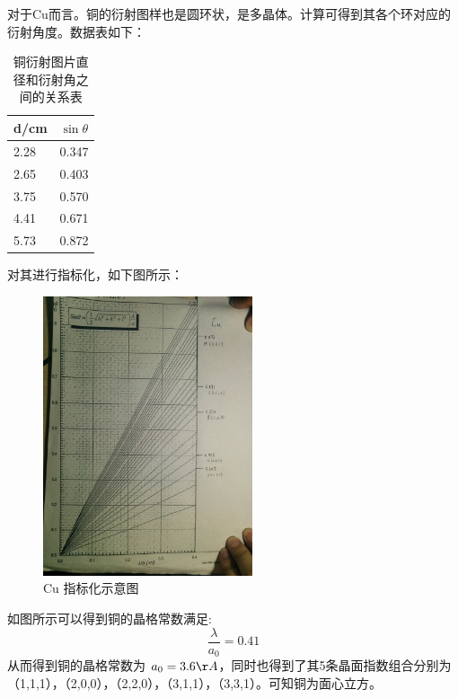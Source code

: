 \documentclass[aps,pre,12pt,preprint,onecolumn,showpacs,showkeys,UTF8]{revtex4-1}
\begin{document}
对于Cu而言。铜的衍射图样也是圆环状，是多晶体。计算可得到其各个环对应的衍射角度。数据表如下：

\begin{center}
	\begin{table}[h]
		\caption{铜衍射图片直径和衍射角之间的关系表}
		\begin{tabularx}{10cm}{XX}
			\hline
			\hline
			d/cm&$\sin{\theta}$\\
			\hline
			2.28&0.347\\
			2.65&0.403\\
			3.75&0.570\\
			4.41&0.671\\
			5.73&0.872\\
			\hline
			\hline
		\end{tabularx}
	\end{table}
\end{center}
\newpage
对其进行指标化，如下图所示：
\begin{figure}[h]
	\begin{center}
		\includegraphics[width=0.55\textwidth]{Cu.png}
		\caption{\label{fig:exp2}Cu 指标化示意图}
	\end{center}
\end{figure}

如图所示可以得到铜的晶格常数满足:
\begin{equation}
	\frac{\lambda}{a_0}=0.41
\end{equation}
从而得到铜的晶格常数为 $a_0=3.6\AA$，同时也得到了其5条晶面指数组合分别为（1,1,1），（2,0,0），（2,2,0），（3,1,1），（3,3,1）。可知铜为面心立方。
\end{document}
